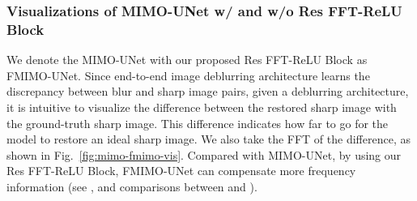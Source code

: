 \documentclass[letterpaper]{article} \usepackage{aaai23}  \usepackage{times}  \usepackage{helvet}  \usepackage{courier}  \usepackage[hyphens]{url}  \usepackage{graphicx} \usepackage{enumitem}
\begin{document}
\subsubsection{Visualizations of MIMO-UNet w/ and w/o Res FFT-ReLU Block}
We denote the MIMO-UNet with our proposed Res FFT-ReLU Block as FMIMO-UNet. Since end-to-end image deblurring architecture learns the discrepancy between blur and sharp image pairs, given a deblurring architecture, it is intuitive to visualize the difference between the restored sharp image with the ground-truth sharp image. This difference indicates how far to go for the model to restore an ideal sharp image. We also take the FFT of the difference, as shown in Fig.~\ref{fig:mimo-fmimo-vis}. Compared with MIMO-UNet, by using our Res FFT-ReLU Block, FMIMO-UNet can compensate more frequency information (see , and comparisons between  and ).

\begin{table}[t]
\renewcommand\arraystretch{1}
\footnotesize
\centering
\caption{Parameters, FLOPs and runtime
(average testing time per image in GoPro dataset on a NVIDIA 3090 GPU) comparison. {\color{red}} means testing an image for 4 times by test time augmentation.}
\label{tab:flops}
\end{table}
\end{document}
